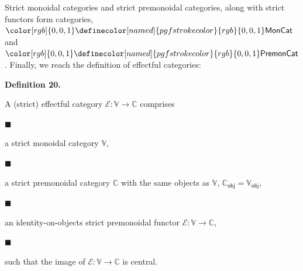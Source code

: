  
 
 
Strict monoidal categories and strict premonoidal categories, along with strict functors form categories, ${\color[rgb]{0,0,1}\definecolor[named]{pgfstrokecolor}{rgb}{0,0,1}\mathsf{MonCat}}$ and ${\color[rgb]{0,0,1}\definecolor[named]{pgfstrokecolor}{rgb}{0,0,1}\mathsf{PremonCat}}$. Finally, we reach the definition of effectful categories:\par
 
 
 
\par\medskip\noindent\textbf{Definition 20.}\par
 
 
A (strict) effectful category $\mathscr{E}:\mathbb{V}\to\mathbb{C}$ comprises\par
  
\par\noindent  $\blacksquare$ 
 
a strict monoidal category $\mathbb{V}$,\par
 
 
 
\par\noindent  $\blacksquare$ 
 
a strict premonoidal category $\mathbb{C}$ with the same objects as $\mathbb{V}$, $\mathbb{C}_{\mathsf{obj}}=\mathbb{V}_{\mathsf{obj}}$,\par
 
 
 
\par\noindent  $\blacksquare$ 
 
an identity-on-objects strict premonoidal functor $\mathscr{E}:\mathbb{V}\to\mathbb{C}$,\par
 
 
 
\par\noindent  $\blacksquare$ 
 
such that the image of $\mathscr{E}:\mathbb{V}\to\mathbb{C}$ is central.\par
 
 
  
 
